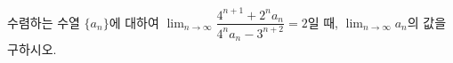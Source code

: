 수렴하는 수열 $\{a_n\}$에 대하여 $\displaystyle\lim_{n\to\infty}\dfrac{4^{n+1}+2^na_n}{4^na_n-3^{n+2}}=2$일 때, $\displaystyle\lim_{n\to\infty}a_n$의 값을 구하시오.
